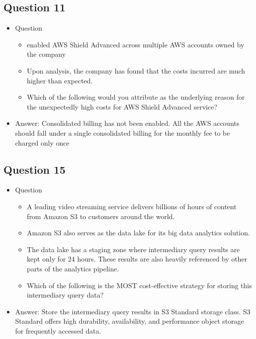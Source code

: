 \documentclass[]{scrartcl}
\begin{document}
\subsection{Question 11}
\begin{itemize}
	\item Question
	\begin{itemize}
		\item enabled AWS Shield Advanced across multiple AWS accounts owned by the company
		\item Upon analysis, the company has found that the costs incurred are much higher than expected.
		\item Which of the following would you attribute as the underlying reason for the unexpectedly high costs for AWS Shield Advanced service?
	\end{itemize}
	\item Answer: Consolidated billing has not been enabled. All the AWS accounts should fall under a single consolidated billing for the monthly fee to be charged only once 
\end{itemize}

\subsection{Question 15}
\begin{itemize}
	\item Question
	\begin{itemize}
		\item A leading video streaming service delivers billions of hours of content from Amazon S3 to customers around the world. 
		\item Amazon S3 also serves as the data lake for its big data analytics solution. 
		\item The data lake has a staging zone where intermediary query results are kept only for 24 hours. These results are also heavily referenced by other parts of the analytics pipeline.
		\item Which of the following is the MOST cost-effective strategy for storing this intermediary query data?
	\end{itemize}
	\item Answer: Store the intermediary query results in S3 Standard storage class. S3 Standard offers high durability, availability, and performance object storage for frequently accessed data. 
\end{itemize}
\end{document}
